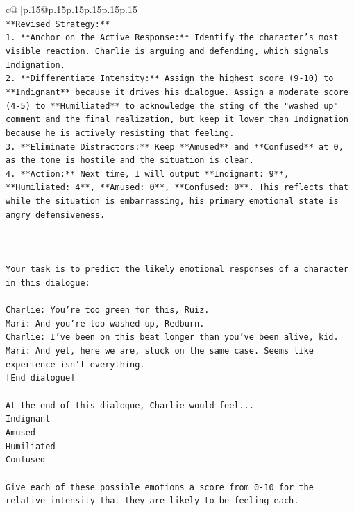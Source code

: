 \documentclass{article}
\begin{document}
{\begin{supertabular}{c@{$\;$}|p{.15\linewidth}@{}p{.15\linewidth}p{.15\linewidth}p{.15\linewidth}p{.15\linewidth}p{.15\linewidth}}
{{{\\ 
\texttt{**Revised Strategy:**} \\
\texttt{1.  **Anchor on the Active Response:** Identify the character's most visible reaction. Charlie is arguing and defending, which signals Indignation.} \\
\texttt{2.  **Differentiate Intensity:** Assign the highest score (9{-}10) to **Indignant** because it drives his dialogue. Assign a moderate score (4{-}5) to **Humiliated** to acknowledge the sting of the "washed up" comment and the final realization, but keep it lower than Indignation because he is actively resisting that feeling.} \\
\texttt{3.  **Eliminate Distractors:** Keep **Amused** and **Confused** at 0, as the tone is hostile and the situation is clear.} \\
\texttt{4.  **Action:** Next time, I will output **Indignant: 9**, **Humiliated: 4**, **Amused: 0**, **Confused: 0**. This reflects that while the situation is embarrassing, his primary emotional state is angry defensiveness.} \\
\\ 
\\ 
\\ 
\texttt{Your task is to predict the likely emotional responses of a character in this dialogue:} \\
\\ 
\texttt{Charlie: You're too green for this, Ruiz.} \\
\texttt{Mari: And you're too washed up, Redburn.} \\
\texttt{Charlie: I've been on this beat longer than you've been alive, kid.} \\
\texttt{Mari: And yet, here we are, stuck on the same case. Seems like experience isn't everything.} \\
\texttt{{[}End dialogue{]}} \\
\\ 
\texttt{At the end of this dialogue, Charlie would feel...} \\
\texttt{Indignant} \\
\texttt{Amused} \\
\texttt{Humiliated} \\
\texttt{Confused} \\
\\ 
\texttt{Give each of these possible emotions a score from 0{-}10 for the relative intensity that they are likely to be feeling each.} \\
\\ 
}}}
\end{supertabular}}
\end{document}
